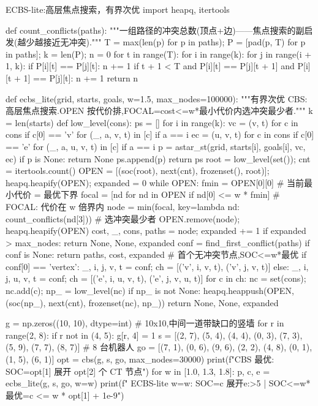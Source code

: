 \begin{codebox}[Python]{ECBS-lite:高层焦点搜索，有界次优}
import heapq, itertools

def count_conflicts(paths):
    """一组路径的冲突总数(顶点+边)——焦点搜索的副启发(越少越接近无冲突)."""
    T = max(len(p) for p in paths); P = [pad(p, T) for p in paths]; k = len(P); n = 0
    for t in range(T):
        for i in range(k):
            for j in range(i + 1, k):
                if P[i][t] == P[j][t]: n += 1
                if t + 1 < T and P[i][t] == P[j][t + 1] and P[i][t + 1] == P[j][t]: n += 1
    return n

def ecbs_lite(grid, starts, goals, w=1.5, max_nodes=100000):
    """有界次优 CBS:高层焦点搜索.OPEN 按代价排,FOCAL={cost<=w*最小代价}内选冲突最少者."""
    k = len(starts)
    def low_level(cons):
        ps = []
        for i in range(k):
            vc = {(v, t) for c in cons if c[0] == 'v' for (_, a, v, t) in [c] if a == i}
            ec = {(u, v, t) for c in cons if c[0] == 'e' for (_, a, u, v, t) in [c] if a == i}
            p = astar_st(grid, starts[i], goals[i], vc, ec)
            if p is None: return None
            ps.append(p)
        return ps
    root = low_level(set()); cnt = itertools.count()
    OPEN = [(soc(root), next(cnt), frozenset(), root)]; heapq.heapify(OPEN); expanded = 0
    while OPEN:
        fmin = OPEN[0][0]                                   # 当前最小代价 = 最优下界
        focal = [nd for nd in OPEN if nd[0] <= w * fmin]    # FOCAL: 代价在 w 倍界内
        node = min(focal, key=lambda nd: count_conflicts(nd[3]))   # 选冲突最少者
        OPEN.remove(node); heapq.heapify(OPEN)
        cost, _, cons, paths = node; expanded += 1
        if expanded > max_nodes: return None, None, expanded
        conf = find_first_conflict(paths)
        if conf is None: return paths, cost, expanded       # 首个无冲突节点,SOC<=w*最优
        if conf[0] == 'vertex':
            _, i, j, v, t = conf; ch = [('v', i, v, t), ('v', j, v, t)]
        else:
            _, i, j, u, v, t = conf; ch = [('e', i, u, v, t), ('e', j, v, u, t)]
        for c in ch:
            nc = set(cons); nc.add(c); np_ = low_level(nc)
            if np_ is not None:
                heapq.heappush(OPEN, (soc(np_), next(cnt), frozenset(nc), np_))
    return None, None, expanded

g = np.zeros((10, 10), dtype=int)                          # 10x10,中间一道带缺口的竖墙
for r in range(2, 8):
    if r not in (4, 5): g[r, 4] = 1
s  = [(2, 7), (5, 4), (4, 4), (0, 3), (7, 3), (5, 9), (7, 7), (8, 7)]   # 8 台机器人
go = [(7, 1), (0, 6), (9, 6), (2, 2), (4, 8), (0, 1), (1, 5), (6, 1)]
opt = cbs(g, s, go, max_nodes=30000)
print(f"CBS 最优: SOC={opt[1]} 展开 {opt[2]} 个 CT 节点")
for w in [1.0, 1.3, 1.8]:
    p, c, e = ecbs_lite(g, s, go, w=w)
    print(f"  ECBS-lite w={w}: SOC={c} 展开{e:>5} | SOC<=w*最优={c <= w * opt[1] + 1e-9}")
\end{codebox}

